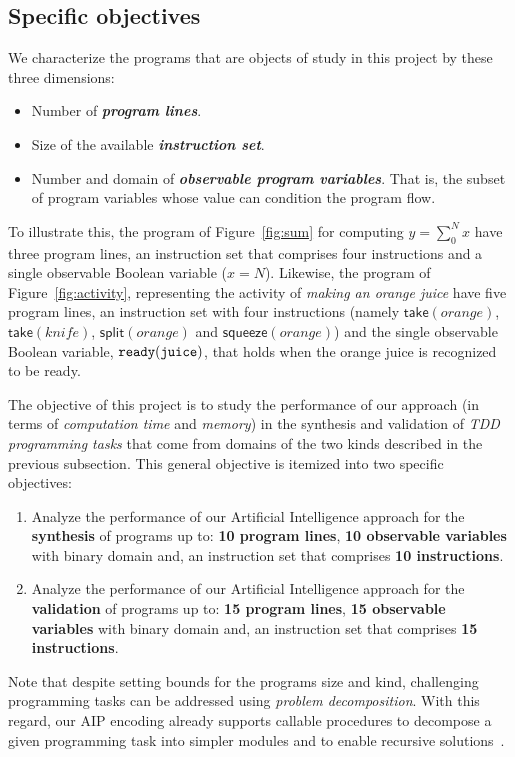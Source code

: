 \documentclass[10pt,a4paper]{paper}
\begin{document}
\subsection{Specific objectives}
\label{sec:objectivos}
We characterize the programs that are objects of study in this project by these three dimensions:
\begin{itemize}
\item Number of {\bf\em program lines}.
\item Size of the available {\bf\em instruction set}.
\item Number and domain of {\bf\em observable program variables}. That is, the subset of program variables whose value can condition the program flow.
\end{itemize}  

To illustrate this, the program of Figure~\ref{fig:sum} for computing $y = \sum_0^N x$ have three program lines, an instruction set that comprises four instructions and a single observable Boolean variable ($x=N$). Likewise, the program of Figure~\ref{fig:activity}, representing the activity of {\em making an orange juice} have five program lines, an instruction set with four instructions (namely $\mathsf{take}(orange)$, $\mathsf{take}(knife)$, $\mathsf{split}(orange)$ and $\mathsf{squeeze}(orange)$) and the single observable Boolean variable, ${\tt ready(juice)}$, that holds when the orange juice is recognized to be ready.

The objective of this project is to study the performance of our approach (in terms of  {\em computation time} and {\em memory}) in the synthesis and validation of {\em TDD programming tasks} that come from domains of the two kinds described in the previous subsection. This general objective is itemized into two specific objectives:
\begin{enumerate}
\item Analyze the performance of our Artificial Intelligence approach for the {\bf synthesis} of programs up to: {\bf 10 program lines}, {\bf 10 observable variables} with binary domain and, an instruction set that comprises {\bf 10 instructions}. 
\item Analyze the performance of our Artificial Intelligence approach for the {\bf validation} of programs up to: {\bf 15 program lines}, {\bf 15 observable variables} with binary domain and, an instruction set that comprises {\bf 15 instructions}. 
\end{enumerate}

Note that despite setting bounds for the programs size and kind, challenging programming tasks can be addressed using {\em problem decomposition}. With this regard, our AIP encoding already supports callable procedures to decompose a given programming task into simpler modules and to enable recursive solutions~\cite{sergio:aprograming:icaps16,sergio:aprograming:ijcai16,jimenez2018review,segovia:FSC:JAIR2018,segovia:programs:AIJ19}.
\end{document}
